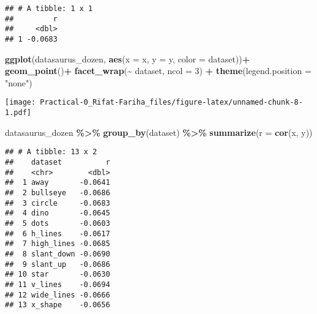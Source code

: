 \documentclass[
]{article}
\newenvironment{Shaded}{\begin{snugshade}}{\end{snugshade}}
\newcommand{\AttributeTok}[1]{\textcolor[rgb]{0.13,0.29,0.53}{#1}}
\newcommand{\DecValTok}[1]{\textcolor[rgb]{0.00,0.00,0.81}{#1}}
\newcommand{\FunctionTok}[1]{\textcolor[rgb]{0.13,0.29,0.53}{\textbf{#1}}}
\newcommand{\NormalTok}[1]{#1}
\newcommand{\SpecialCharTok}[1]{\textcolor[rgb]{0.81,0.36,0.00}{\textbf{#1}}}
\newcommand{\StringTok}[1]{\textcolor[rgb]{0.31,0.60,0.02}{#1}}
\begin{document}
\begin{verbatim}
## # A tibble: 1 x 1
##         r
##     <dbl>
## 1 -0.0683
\end{verbatim}

\begin{Shaded}
\begin{Highlighting}[]
\FunctionTok{ggplot}\NormalTok{(datasaurus\_dozen, }\FunctionTok{aes}\NormalTok{(}\AttributeTok{x =}\NormalTok{ x, }\AttributeTok{y =}\NormalTok{ y, }\AttributeTok{color =}\NormalTok{ dataset))}\SpecialCharTok{+}
  \FunctionTok{geom\_point}\NormalTok{()}\SpecialCharTok{+}
  \FunctionTok{facet\_wrap}\NormalTok{(}\SpecialCharTok{\textasciitilde{}}\NormalTok{ dataset, }\AttributeTok{ncol =} \DecValTok{3}\NormalTok{) }\SpecialCharTok{+}
  \FunctionTok{theme}\NormalTok{(}\AttributeTok{legend.position =} \StringTok{"none"}\NormalTok{)}
\end{Highlighting}
\end{Shaded}

\texttt{[image: Practical-0\_Rifat-Fariha\_files/figure-latex/unnamed-chunk-8-1.pdf]}

\begin{Shaded}
\begin{Highlighting}[]
\NormalTok{datasaurus\_dozen }\SpecialCharTok{\%\textgreater{}\%}
  \FunctionTok{group\_by}\NormalTok{(dataset) }\SpecialCharTok{\%\textgreater{}\%}
  \FunctionTok{summarize}\NormalTok{(}\AttributeTok{r =} \FunctionTok{cor}\NormalTok{(x, y))}
\end{Highlighting}
\end{Shaded}

\begin{verbatim}
## # A tibble: 13 x 2
##    dataset          r
##    <chr>        <dbl>
##  1 away       -0.0641
##  2 bullseye   -0.0686
##  3 circle     -0.0683
##  4 dino       -0.0645
##  5 dots       -0.0603
##  6 h_lines    -0.0617
##  7 high_lines -0.0685
##  8 slant_down -0.0690
##  9 slant_up   -0.0686
## 10 star       -0.0630
## 11 v_lines    -0.0694
## 12 wide_lines -0.0666
## 13 x_shape    -0.0656
\end{verbatim}
\end{document}
